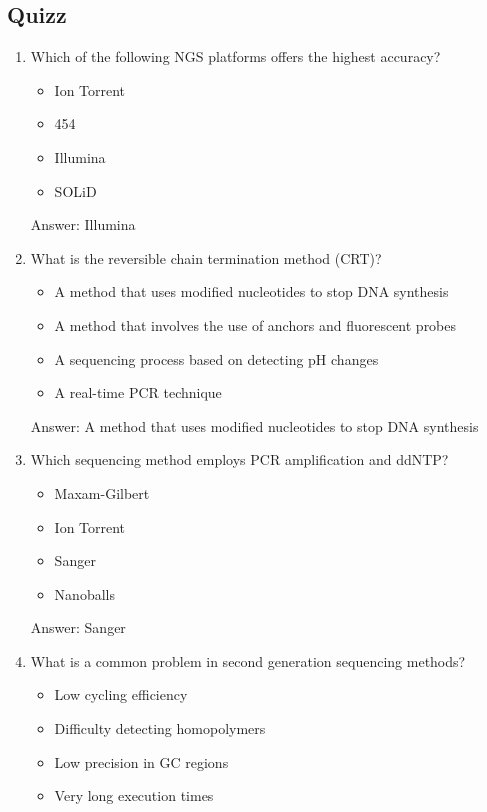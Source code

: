 \subsection{Quizz}
\begin{enumerate}
\item Which of the following NGS platforms offers the highest accuracy?
\begin{itemize}
\item Ion Torrent
\item 454
\item Illumina
\item SOLiD
\end{itemize}

Answer: Illumina

\item What is the reversible chain termination method (CRT)?
\begin{itemize}
\item A method that uses modified nucleotides to stop DNA synthesis
\item A method that involves the use of anchors and fluorescent probes
\item A sequencing process based on detecting pH changes
\item A real-time PCR technique
\end{itemize}

Answer: A method that uses modified nucleotides to stop DNA synthesis

\item Which sequencing method employs PCR amplification and ddNTP?
\begin{itemize}
\item Maxam-Gilbert
\item Ion Torrent
\item Sanger
\item Nanoballs
\end{itemize}

Answer: Sanger

\item What is a common problem in second generation sequencing methods?
\begin{itemize}
\item Low cycling efficiency
\item Difficulty detecting homopolymers
\item Low precision in GC regions
\item Very long execution times
\end{itemize}


\end{enumerate}
